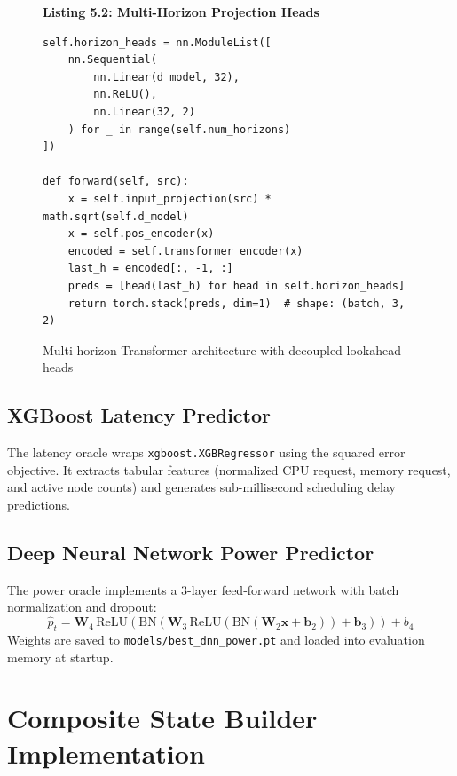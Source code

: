 \documentclass[12pt]{report}
\begin{document}
\begin{figure}[htbp]
\centering
\begin{minipage}{\linewidth}
\begin{framed}
\footnotesize
\textbf{Listing 5.2: Multi-Horizon Projection Heads}
\begin{verbatim}
self.horizon_heads = nn.ModuleList([
    nn.Sequential(
        nn.Linear(d_model, 32),
        nn.ReLU(),
        nn.Linear(32, 2)
    ) for _ in range(self.num_horizons)
])

def forward(self, src):
    x = self.input_projection(src) * math.sqrt(self.d_model)
    x = self.pos_encoder(x)
    encoded = self.transformer_encoder(x)
    last_h = encoded[:, -1, :]
    preds = [head(last_h) for head in self.horizon_heads]
    return torch.stack(preds, dim=1)  # shape: (batch, 3, 2)
\end{verbatim}
\end{framed}
\end{minipage}
\caption{Multi-horizon Transformer architecture with decoupled lookahead heads}
\label{lst:transformer}
\end{figure}

\subsection{XGBoost Latency Predictor}
The latency oracle wraps \texttt{xgboost.\allowbreak XGBRegressor} using the squared error objective. It extracts tabular features (normalized CPU request, memory request, and active node counts) and generates sub-millisecond scheduling delay predictions.

\subsection{Deep Neural Network Power Predictor}
The power oracle implements a 3-layer feed-forward network with batch normalization and dropout:
\begin{equation}
\hat{p}_t = \mathbf{W}_4 \, \text{ReLU}\left( \text{BN}\left( \mathbf{W}_3 \, \text{ReLU}\left( \text{BN}\left( \mathbf{W}_2 \mathbf{x} + \mathbf{b}_2 \right) \right) + \mathbf{b}_3 \right) \right) + b_4
\end{equation}
Weights are saved to \texttt{models/\allowbreak best\_dnn\_power.\allowbreak pt} and loaded into evaluation memory at startup.

\section{Composite State Builder Implementation}
\end{document}
